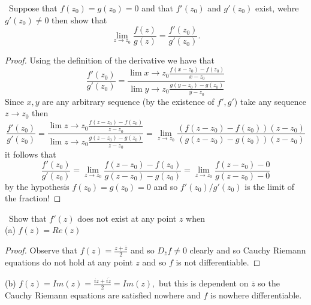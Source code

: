 \documentclass[11pt]{amsart}
\theoremstyle{definition}
\numberwithin{theorem}{section}
\numberwithin{definition}{section}
\numberwithin{equation}{section}
\begin{document}
\medskip {}\ Suppose that $f(z_0) = g(z_0) = 0$ and that $f'(z_0)$ and $g'(z_0)$ exist, wehre $g'(z_0) \neq 0$ then show that \begin{equation*}
  \lim_{z \to z_0} \frac{f(z)}{g(z)} = \frac{f'(z_0)}{g'(z_0)}.
\end{equation*}
\begin{proof}
  Using the definition of the derivative we have that
\begin{equation*}
  \frac{f'(z_0)}{g'(z_0)} = \frac{\lim x \to z_0 \frac{f(x - z_0) - f(z_0)}{x - z_0} }{\lim y \to z_0 \frac{g(y - z_0) - g(z_0)}{y - z_0}}
\end{equation*}
Since $x,y$ are any arbitrary sequence (by the existence of $f', g'$) take any sequence $z \to z_0$ then
\begin{equation*}
   \frac{f'(z_0)}{g'(z_0)} = \frac{\lim z \to z_0 \frac{f(z - z_0) - f(z_0)}{z - z_0} }{\lim z \to z_0 \frac{g(z - z_0) - g(z_0)}{z - z_0}} =\lim_{z\to z_0} \frac{(f(z - z_0) - f(z_0))(z - z_0)}{(g(z - z_0) - g(z_0))(z - z_0)}
\end{equation*}
it follows that \begin{equation*}
  \frac{f'(z_0)}{g'(z_0)} = \lim_{z\to z_0} \frac{f(z - z_0) - f(z_0)}{g(z - z_0) - g(z_0)} = \lim_{z\to z_0} \frac{f(z - z_0) - 0}{g(z - z_0) - 0}
\end{equation*}
by the hypothesis $f(z_0) = g(z_0) = 0$ and so $f'(z_0)/g'(z_0)$ is the limit of the fraction!
\end{proof}

\medskip {}\ Show that $f'(z)$ does not exist at any point $z$ when \\
\noindent (a) $f(z) = Re(z)$
\begin{proof}
  Observe that $f(z) = \frac{z + \overline{z}}{2}$ and so $D_{\overline{z}} f \neq 0$ clearly and so Cauchy Riemann equations do not hold at any point $z$ and so $f$ is not differentiable.
\end{proof}
\noindent (b) $f(z) = Im(z) = \frac{iz + \overline{iz}}{2} = Im(z),$ but this is dependent on $\overline{z}$ so the Cauchy Riemann equations are satisfied nowhere and $f$ is nowhere differentiable. 
\end{document}
